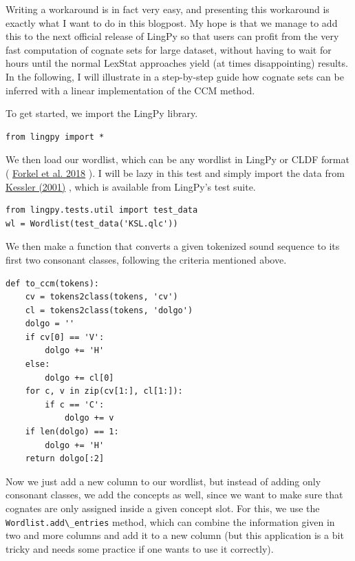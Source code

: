 \documentclass[
  english,
  a4paper,
  oneside,tablecaptionabove
]{scrbook}
\newcommand{\passthrough}[1]{#1}
\begin{document}
Writing a workaround is in fact very easy, and presenting this
workaround is exactly what I want to do in this blogpost. My hope is
that we manage to add this to the next official release of LingPy so
that users can profit from the very fast computation of cognate sets for
large dataset, without having to wait for hours until the normal LexStat
approaches yield (at times disappointing) results. In the following, I
will illustrate in a step-by-step guide how cognate sets can be inferred
with a linear implementation of the CCM method.

To get started, we import the LingPy library.

\begin{lstlisting}
from lingpy import *
\end{lstlisting}

We then load our wordlist, which can be any wordlist in LingPy or CLDF
format ( \href{http://bibliography.lingpy.org?key=Forkel2018a}{Forkel et
al. 2018} ). I will be lazy in this test and simply import the data from
\href{http://bibliography.lingpy.org?key=Kessler2001}{Kessler (2001)} ,
which is available from LingPy's test suite.

\begin{lstlisting}
from lingpy.tests.util import test_data
wl = Wordlist(test_data('KSL.qlc'))
\end{lstlisting}

We then make a function that converts a given tokenized sound sequence
to its first two consonant classes, following the criteria mentioned
above.

\begin{lstlisting}
def to_ccm(tokens):
    cv = tokens2class(tokens, 'cv')
    cl = tokens2class(tokens, 'dolgo')
    dolgo = ''
    if cv[0] == 'V': 
        dolgo += 'H'
    else:
        dolgo += cl[0]
    for c, v in zip(cv[1:], cl[1:]):
        if c == 'C':
            dolgo += v
    if len(dolgo) == 1:
        dolgo += 'H'
    return dolgo[:2]
\end{lstlisting}

Now we just add a new column to our wordlist, but instead of adding only
consonant classes, we add the concepts as well, since we want to make
sure that cognates are only assigned inside a given concept slot. For
this, we use the \passthrough{\lstinline!Wordlist.add\_entries!} method,
which can combine the information given in two and more columns and add
it to a new column (but this application is a bit tricky and needs some
practice if one wants to use it correctly).
\end{document}
